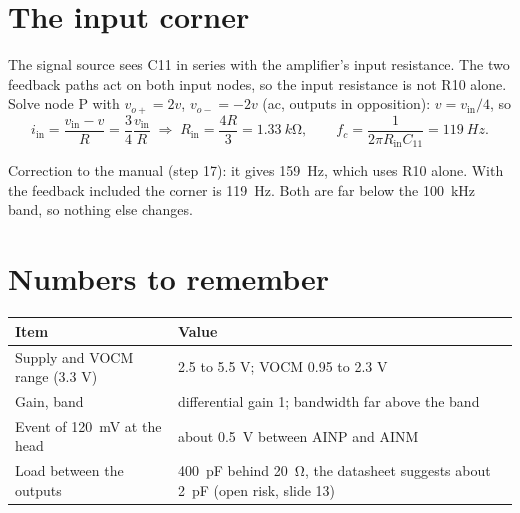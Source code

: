 \documentclass[11pt,a4paper]{article}
\begin{document}
\section{The input corner}
The signal source sees C11 in series with the amplifier's input resistance. The two feedback paths act on both input nodes, so the input resistance is not R10 alone. Solve node P with $v_{o+}=2v$, $v_{o-}=-2v$ (ac, outputs in opposition): $v=v_\text{in}/4$, so
\[
i_\text{in}=\frac{v_\text{in}-v}{R}=\frac{3}{4}\frac{v_\text{in}}{R}
\;\Rightarrow\;
R_\text{in}=\frac{4R}{3}=\SI{1.33}{k\ohm},\qquad
f_c=\frac{1}{2\pi R_\text{in}C_{11}}=\SI{119}{Hz}.
\]
\begin{key}
Correction to the manual (step 17): it gives \SI{159}{Hz}, which uses R10 alone. With the feedback included the corner is \SI{119}{Hz}. Both are far below the \SI{100}{kHz} band, so nothing else changes.
\end{key}

\section{Numbers to remember}
\begin{center}\begin{tabular}{lp{9cm}}
\toprule Item & Value\\\midrule
Supply and VOCM range (3.3 V) & 2.5 to 5.5 V; VOCM 0.95 to 2.3 V\\
Gain, band & differential gain 1; bandwidth far above the band\\
Event of \SI{120}{mV} at the head & about \SI{0.5}{V} between AINP and AINM\\
Load between the outputs & \SI{400}{pF} behind \SI{20}{\ohm}, the datasheet suggests about \SI{2}{pF} (open risk, slide 13)\\
\bottomrule\end{tabular}\end{center}
\end{document}
